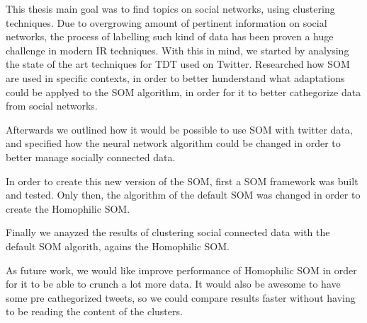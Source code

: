 \label{ch:conclusions}
This thesis main goal was to find topics on social networks, using clustering techniques. Due to overgrowing amount of pertinent information on social networks, the process of labelling such kind of data has been proven a huge challenge in modern \ac{IR} techniques. 
With this in mind, we started by analysing the state of the art techniques for \ac{TDT} used on Twitter. Researched how \ac{SOM} are used in specific contexts, in order to better hunderstand what adaptations could be applyed to the \ac{SOM} algorithm, in order for it to better cathegorize data from social networks.

Afterwards we outlined how it would be possible to use \ac{SOM} with twitter data, and specified how the neural network algorithm could be changed in order to better manage socially connected data. 

In order to create this new version of the \ac{SOM}, first a \ac{SOM} framework was built and tested. Only then, the algorithm of the default \ac{SOM} was changed in order to create the Homophilic SOM.

Finally we anayzed the results of clustering social connected data with the default \ac{SOM} algorith, agains the Homophilic SOM.

As future work, we would like improve performance of Homophilic \ac{SOM} in order for it to be able to crunch a lot more data. It would also be awesome to have some pre cathegorized tweets, so we could compare results faster without having to be reading the content of the clusters.

\cleardoublepage
 
